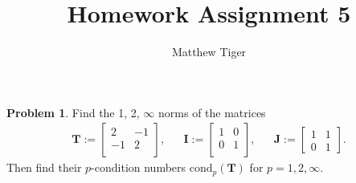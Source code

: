 \documentclass[12pt]{article}
\title{Homework Assignment 5}
\author{Matthew Tiger}
\theoremstyle{definition}
\newtheorem{problem}{Problem}
\newcommand{\vect}[1]{\boldsymbol{#1}}
\begin{document}
\maketitle


\begin{problem}
  Find the 1, 2, $\infty$ norms of the matrices
  \begin{align*}
    \vect{T}:= \begin{bmatrix}2 & -1 \\ -1 & 2 \\\end{bmatrix}, && \vect{I} := \begin{bmatrix}1 & 0 \\ 0 & 1\\\end{bmatrix}, && \vect{J} := \begin{bmatrix}1 & 1\\ 0 & 1\end{bmatrix}.
  \end{align*}
  Then find their $p$-condition numbers $\text{cond}_p(\vect{T})$ for $p=1, 2, \infty$.
\end{problem}
\end{document}
